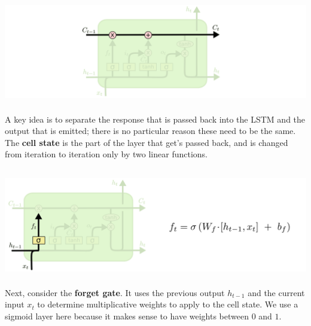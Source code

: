 \documentclass[xetex,mathserif,serif,aspectratio=169]{beamer}
\begin{document}
\begin{frame}[fragile] \frametitle{} \oldB \small

\begin{center}
\includegraphics[height=4.5cm]{img/cloah08.png}
\end{center}

A key idea is to separate the response that is passed back into
the LSTM and the output that is emitted; there is no particular
reason these need to be the same. The \textbf{cell state} is the
part of the layer that get's passed back, and is changed from
iteration to iteration only by two linear functions.

\end{frame}

\begin{frame}[fragile] \frametitle{} \oldB \small

\begin{center}
\includegraphics[height=4.5cm]{img/cloah09.png}
\end{center}

Next, consider the \textbf{forget gate}. It uses the previous
output $h_{t-1}$ and the current input $x_t$ to determine
multiplicative weights to apply to the cell state. We use a
sigmoid layer here because it makes sense to have weights
between $0$ and $1$.

\end{frame}
\end{document}
